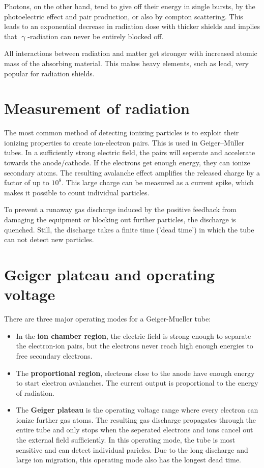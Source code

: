 Photons, on the other hand, tend to give off their energy in single bursts, by the photoelectric effect and pair production, or also by compton scattering.
This leads to an exponential decrease in radiation dose with thicker shields and implies that $\upgamma$-radiation can never be entirely blocked off.

All interactions between radiation and matter get stronger with increased atomic mass of the absorbing material.
This makes heavy elements, such as lead, very popular for radiation shields.

\section{Measurement of radiation}\label{sec:geiger_shit}
The most common method of detecting ionizing particles is to exploit their ionizing properties to create ion-electron pairs.
This is used in Geiger–Müller tubes.
In a sufficiently strong electric field, the pairs will seperate and accelerate towards the anode/cathode.
If the electrons get enough energy, they can ionize secondary atoms.
The resulting avalanche effect amplifies the released charge by a factor of up to $10^8$.
This large charge can be measured as a current spike, which makes it possible to count individual particles.

To prevent a runaway gas discharge induced by the positive feedback from damaging the equipment or blocking out further particles, the discharge is quenched.
Still, the discharge takes a finite time ('dead time') in which the tube can not detect new particles.

\section{Geiger plateau and operating voltage}
There are three major operating modes for a Geiger-Mueller tube:
\begin{itemize}
	\item In the \textbf{ion chamber region}, the electric field is strong enough to separate the electron-ion pairs, but the electrons never reach high enough energies to free secondary electrons.
	\item The \textbf{proportional region}, electrons close to the anode have enough energy to start electron avalanches. The current output is proportional to the energy of radiation.
	\item The \textbf{Geiger plateau} is the operating voltage range where every electron can ionize further gas atoms.
	The resulting gas discharge propagates through the entire tube and only stops when the seperated electrons and ions cancel out the external field sufficiently.
	In this operating mode, the tube is most sensitive and can detect individual paricles.
	Due to the long discharge and large ion migration, this operating mode also has the longest dead time.
\end{itemize}
